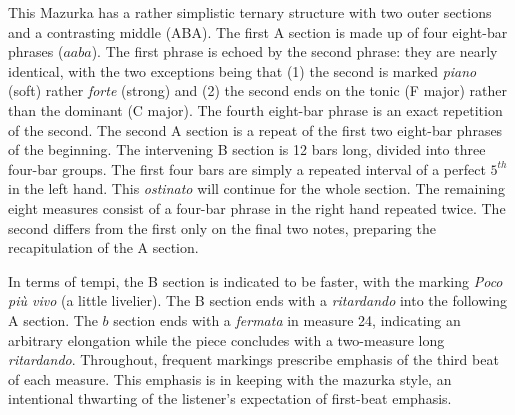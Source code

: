 \documentclass[aoas]{imsart}
\begin{document}
This Mazurka has a rather simplistic ternary structure with two outer
sections and a contrasting middle (ABA). The first A section is made
up of four eight-bar phrases ($aaba$). The first phrase is echoed by the
second phrase: they are nearly identical, with the two exceptions
being that (1) the
second is marked {\em piano} (soft) rather {\em forte} (strong) and (2)
the second ends on the tonic (F major) rather than the dominant
(C major). The fourth eight-bar phrase is an exact repetition of the
second. The second A section is a repeat of the first two
eight-bar phrases of the beginning. The intervening B section is 12
bars long, divided into three four-bar groups. The first four bars are
simply a repeated interval of a perfect $5^{th}$ in the left
hand. This {\em ostinato} will continue for the whole section. The remaining
eight measures consist of a four-bar phrase in the right hand repeated twice. The second differs from the first only on the final two notes, preparing the
recapitulation of the A section.

In terms of tempi, the B section is indicated to be faster, with the
marking {\em Poco pi\`u vivo} (a little livelier). The B section ends
with a {\em ritardando} into the following A section. The $b$ section ends
with a {\em fermata} in measure 24, indicating an arbitrary
elongation while the piece
concludes with a two-measure long {\em ritardando}. Throughout, 
frequent markings prescribe emphasis of the third beat of each measure. This
emphasis is in keeping with the mazurka style, an intentional
thwarting of the listener's expectation of first-beat emphasis.
\end{document}
